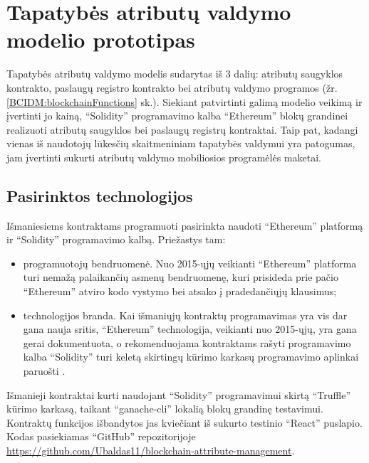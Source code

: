 \section{Tapatybės atributų valdymo modelio prototipas}

Tapatybės atributų valdymo modelis sudarytas iš 3 dalių: atributų saugyklos kontrakto, paslaugų registro kontrakto bei
atributų valdymo programos (žr. \hypertarget{BCIDM:blockchainFunctions}{\ref{BCIDM:blockchainFunctions}} sk.).
Siekiant patvirtinti galimą modelio veikimą ir įvertinti jo kainą, \enquote{Solidity} programavimo kalba \enquote{Ethereum} blokų grandinei
realizuoti atributų saugyklos bei paslaugų registrų kontraktai. Taip pat, kadangi vienas iš naudotojų
lūkesčių skaitmeniniam tapatybės valdymui yra patogumas, jam įvertinti sukurti atributų valdymo mobiliosios programėlės maketai.

\subsection{Pasirinktos technologijos}

Išmaniesiems kontraktams programuoti pasirinkta naudoti \enquote{Ethereum} platformą ir \enquote{Solidity} programavimo
kalbą. Priežastys tam:

\begin{itemize}
    \item programuotojų bendruomenė. Nuo 2015-ųjų veikianti \enquote{Ethereum} platforma turi nemažą
    palaikančių asmenų bendruomenę, kuri prisideda prie pačio \enquote{Ethereum} atviro kodo vystymo
    bei atsako į pradedančiųjų klausimus;
    \item technologijos branda. Kai išmaniųjų kontraktų programavimas yra vis dar gana nauja sritis,
    \enquote{Ethereum} technologija, veikianti nuo 2015-ųjų, yra gana gerai dokumentuota, o rekomenduojama kontraktams rašyti programavimo kalba
    \enquote{Solidity} \cite{Ethereum} turi keletą skirtingų kūrimo karkasų programavimo aplinkai paruošti \cite{SolidityDocumentation}.
\end{itemize}

Išmanieji kontraktai kurti naudojant \enquote{Solidity} programavimui skirtą \enquote{Truffle} kūrimo karkasą,
taikant \enquote{ganache-cli} lokalią blokų grandinę testavimui. Kontraktų funkcijos išbandytos jas kviečiant iš sukurto testinio
\enquote{React} puslapio. Kodas pasiekiamas \enquote{GitHub} repozitorijoje
\url{https://github.com/Ubaldas11/blockchain-attribute-management}.

